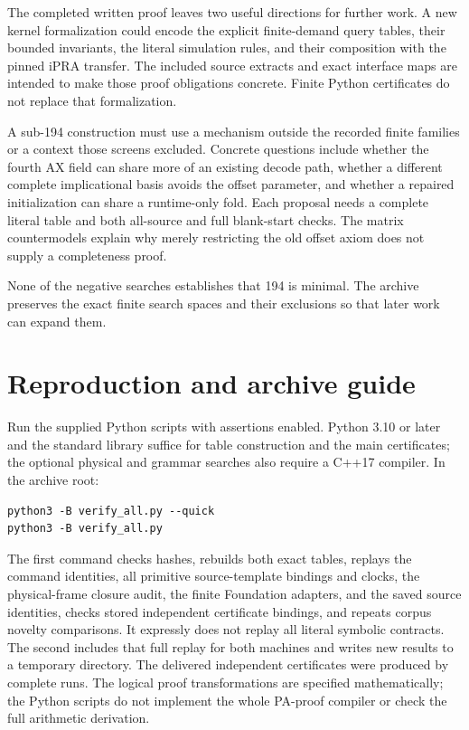 \documentclass[11pt,a4paper]{article}
\begin{document}
The completed written proof leaves two useful directions for further
work. A new kernel formalization could encode the explicit finite-demand
query tables, their bounded invariants, the literal simulation rules,
and their composition with the pinned iPRA transfer. The included
source extracts and exact interface maps are intended to make those
proof obligations concrete. Finite Python certificates do not replace
that formalization.

A sub-194 construction must use a mechanism outside the recorded finite
families or a context those screens excluded. Concrete questions include
whether the fourth AX field can share more of an existing decode path,
whether a different complete implicational basis avoids the offset
parameter, and whether a repaired initialization can share a runtime-only
fold. Each proposal needs a complete literal table and both all-source
and full blank-start checks. The matrix countermodels explain why merely
restricting the old offset axiom does not supply a completeness proof.

None of the negative searches establishes that 194 is minimal. The
archive preserves the exact finite search spaces and their exclusions
so that later work can expand them.

\section{Reproduction and archive guide}

Run the supplied Python scripts with assertions enabled. Python
3.10 or later and the standard library suffice for table construction
and the main certificates; the optional physical and grammar searches
also require a C++17 compiler. In the archive root:
\begin{verbatim}
python3 -B verify_all.py --quick
python3 -B verify_all.py
\end{verbatim}
The first command checks hashes, rebuilds both exact tables, replays
the command identities, all primitive source-template bindings and clocks,
the physical-frame closure audit, the finite Foundation adapters,
and the saved source identities, checks stored
independent certificate bindings, and repeats corpus novelty comparisons.
It expressly does not replay
all literal symbolic contracts. The second includes that full replay
for both machines and writes new results to a temporary directory.
The delivered independent certificates were produced by complete runs.
The logical proof transformations are specified mathematically; the
Python scripts do not implement the whole PA-proof compiler or check
the full arithmetic derivation.
\end{document}
